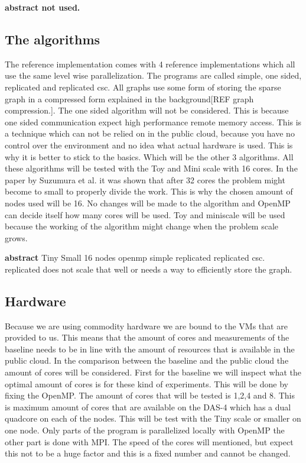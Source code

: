 \textbf{abstract not used.}

\subsection{The algorithms}
The reference implementation comes with 4 reference implementations which all use the same level wise parallelization. The programs are  called simple, one sided, replicated and replicated csc. All graphs use some form of storing the sparse graph in a compressed form explained in the background[REF graph compression.]. The one sided algorithm will not be considered. This is because one sided communication expect high performance remote memory access. This is a technique which can not be relied on in the public cloud, because you have no control over the environment and no idea what actual hardware is used. This is why it is better to stick to the basics. Which will be the other 3 algorithms.
All these algorithms will be tested with the Toy and Mini scale with 16 cores. In the paper by Suzumura et al. \cite{suzumura2011performance} it was shown that after 32 cores the problem might become to small to properly divide the work. This is why the chosen amount of nodes used will be 16. No changes will be made to the algorithm and OpenMP can decide itself how many cores will be used. Toy and miniscale will be used because the working of the algorithm might change when the problem scale grows.

\textbf{abstract}
Tiny Small 16 nodes openmp simple replicated replicated csc. replicated does not scale that well or needs a way to efficiently store the graph. 


\subsection{Hardware}
Because we are using commodity hardware we are  bound to the VMs that are provided to us. This means that the amount of cores and measurements of the baseline needs to be in line with the amount of resources that is available in the public cloud.
In the comparison between the baseline and the public cloud the amount of cores will be considered. First for the baseline we will inspect what the optimal amount of cores is for these kind of experiments. This will be done by fixing the OpenMP.
The amount of cores that will be tested is 1,2,4 and 8. This is maximum amount of cores that are available on the DAS-4 which has a dual quadcore on each of the nodes. This will be test with the Tiny scale or smaller on one node. Only parts of the program is parallelized locally with OpenMP the other part is done with MPI. 
The speed of the cores will mentioned, but expect this not to be a huge factor and this is a fixed number and cannot be changed. 

